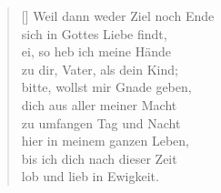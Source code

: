 \begin{multicols}{2}
\begin{verse}[\versewidth]
 Weil dann weder Ziel noch Ende\\
sich in Gottes Liebe findt,\\
ei, so heb ich meine Hände\\
zu dir, Vater, als dein Kind;\\
bitte, wollst mir Gnade geben,\\
dich aus aller meiner Macht\\
zu umfangen Tag und Nacht\\
hier in meinem ganzen Leben,\\
bis ich dich nach dieser Zeit\\
lob und lieb in Ewigkeit.
   
\end{verse}
\end{multicols}
